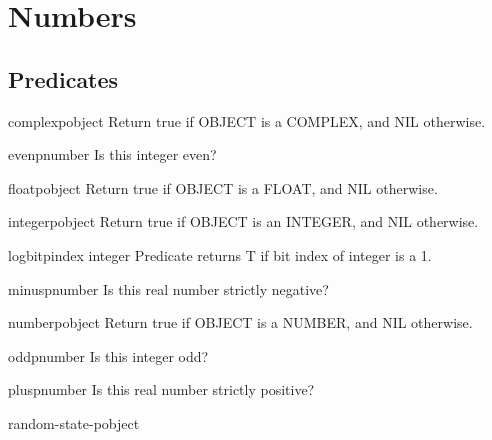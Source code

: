 \chapter{Numbers}

\section{Predicates}
\label{sec:number-predicates}

\begin{function}{complexp}{object}{}{}
  Return true if OBJECT is a COMPLEX, and NIL otherwise.
\end{function}

\begin{function}{evenp}{number}{}{}
  Is this integer even?
\end{function}

\begin{function}{floatp}{object}{}{}
  Return true if OBJECT is a FLOAT, and NIL otherwise.
\end{function}

\begin{function}{integerp}{object}{}{}
  Return true if OBJECT is an INTEGER, and NIL otherwise.
\end{function}

\begin{function}{logbitp}{index integer}{}{}
  Predicate returns T if bit index of integer is a 1.
\end{function}

\begin{function}{minusp}{number}{}{}
  Is this real number strictly negative?
\end{function}

\begin{function}{numberp}{object}{}{}
  Return true if OBJECT is a NUMBER, and NIL otherwise.
\end{function}

\begin{function}{oddp}{number}{}{}
  Is this integer odd?
\end{function}

\begin{function}{plusp}{number}{}{}
  Is this real number strictly positive?
\end{function}

\begin{function}{random-state-p}{object}{}{}
  
\end{function}

